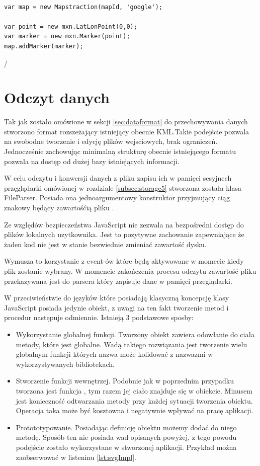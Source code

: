 \lstset{language=JavaScript}
\begin{lstlisting}[label={lst:mapstraction},caption={Wykorzystanie Mapstraction.}]

var map = new Mapstraction(mapId, 'google');

var point = new mxn.LatLonPoint(0,0);
var marker = new mxn.Marker(point);
map.addMarker(marker);

\end{lstlisting}/



\section{Odczyt danych}
\label{sec:idata}

Tak jak zostało omówione w sekcji \ref{sec:dataformat} do przechowywania danych stworzono format rozszeżający istniejący obecnie KML.Takie podejście pozwala na swobodne tworzenie i edycję plików wejsciowych, brak ograniczeń. Jednocześnie zachowując minimalną strukturę obecnie istniejącego formatu pozwala na dostęp od dużej bazy istniejących informacji.

W celu odczytu i konwersji danych z pliku zapisu ich w pamięci sesyjnech przęglądarki omówionej w rozdziale \ref{subsec:storage5} stworzona została klasa FileParser. Posiada ona jednoargumentowy konstruktor przyjmujący ciąg znakowy będący zawartośćią pliku .

Ze względów bezpieczeństwa JavaScript nie zezwala na bezpośredni dostęp do plików lokalnych uzytkownika. Jest to pozytywne zachowanie zapewniające że żaden kod nie jest w stanie bezwiednie zmieniać zawartość dysku.

Wymusza to korzystanie z event-ów które będą aktywowane w momecie kiedy plik zostanie wybrany. W momencie zakończenia procesu odczytu zawartość pliku przekazywana jest do parsera który zapisuje dane w pamięci przeglądarki.

W przeciwieństwie do języków które posiadają klasyczną koncepcję klasy JavaScript posiada jedynie obiekt, z uwagi na ten fakt tworzenie metod i procedur następuje odmiennie. Istnieją 3 podstawowe sposby:

\begin{itemize}
\item
Wykorzystanie globalnej funkcji. Tworzony obiekt zawiera odowłanie do ciała metody, które jest globalne. Wadą takiego rozwiązania jest tworzenie wielu globalnym funkcji których nazwa może kolidować z nazwazmi w wykorzystywanych bibliotekach.
\item
Stworzenie funkcji wewnętrzej. Podobnie jak w poprzednim przypadku tworzona jest funkcja , tym razem jej ciało znajduje się w obiekcie. Minusem jest konieczność odtwarzania metody przy każdej sytuacji tworzenia obiektu. Operacja taka może być kosztowna i negatywnie wpływać na pracę aplikacji.
\item
Protototypowanie. Posiadając definicję obiektu możemy dodać do niego metodę. Sposób ten nie posiada wad opisanych powyżej, z tego powodu podejście zostało wykorzystane w stworzonej aplikacji. Przykład można zaobserwować w listeninu \ref{lst:svgImpl}.
\end{itemize}

